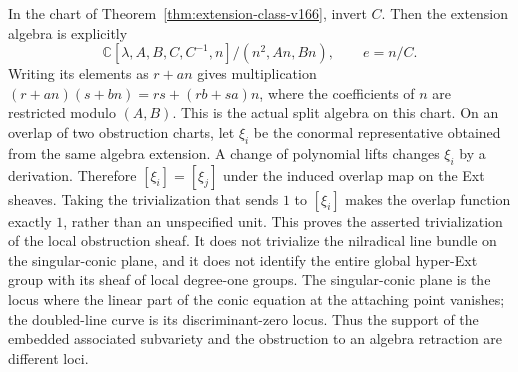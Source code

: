 \documentclass[11pt,reqno]{amsart}
\numberwithin{equation}{section}
\theoremstyle{definition}\newtheorem{definition}[theorem]{Definition}
\theoremstyle{remark}\newtheorem{remark}[theorem]{Remark}
\newcommand{\C}{\mathbb C}\newcommand{\Q}{\mathbb Q}
\begin{document}
In the chart of Theorem~\ref{thm:extension-class-v166}, invert $C$.
Then the extension algebra is explicitly
\[
 \C[\lambda,A,B,C,C^{-1},n]/(n^2,An,Bn),\qquad e=n/C.
\]
Writing its elements as $r+an$ gives multiplication
$(r+an)(s+bn)=rs+(rb+sa)n$, where the coefficients of $n$ are
restricted modulo $(A,B)$. This is the actual split algebra on
this chart. On an overlap of two obstruction charts, let $\xi_i$
be the conormal representative obtained from the same algebra
extension. A change of polynomial lifts changes $\xi_i$ by a
derivation. Therefore $[\xi_i]=[\xi_j]$ under the induced overlap
map on the Ext sheaves. Taking the trivialization that sends
$1$ to $[\xi_i]$ makes the overlap function exactly $1$, rather
than an unspecified unit. This proves the asserted trivialization
of the local obstruction sheaf. It does not trivialize the
nilradical line bundle on the singular-conic plane, and it does
not identify the entire global hyper-Ext group with its sheaf of
local degree-one groups. The singular-conic plane is the locus
where the linear part of the conic equation at the attaching
point vanishes; the doubled-line curve is its discriminant-zero
locus. Thus the support of the embedded associated subvariety
and the obstruction to an algebra retraction are different loci.
\end{document}
